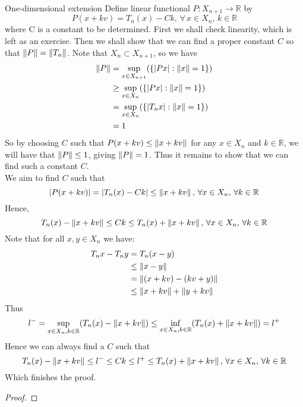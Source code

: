 \documentclass{article}
\begin{document}
\begin{pf}{One-dimensional extension}{}
		Define linear functional $P:X_{n+1}\xrightarrow{}\mathbb{R}$ by
		$$
			P(x+kv)=T_n(x)-Ck,\,\forall\,x\in X_n,\,k\in\mathbb{R}
		$$
		where C is a constant to be determined.
		First we shall check linearity, which is left as an exercise.
		Then we shall show that we can find a proper constant $C$ so that $\left\|{P}\right\|=\left\|{T_n}\right\|$. Note that $X_n\subset X_{n+1}$, so we have
		\begin{equation}
			\begin{split}
				\left\|{P}\right\|&=\sup_{x\in X_{n+1}}(\{|Px|:\left\|{x}\right\|=1\})\\
				&\geq\sup_{x\in X_{n}}(\{|Px|:\left\|{x}\right\|=1\})\\
				&=\sup_{x\in X_{n}}(\{|T_nx|:\left\|{x}\right\|=1\})\\
				&=1
			\end{split}
		\end{equation}
		So by choosing $C$ such that $P(x+kv)\leq \left\|{x+kv}\right\|$ for any $x\in X_n$ and $k\in \mathbb{R}$, we will have that $\left\|{P}\right\|\leq 1$, giving $\left\|{P}\right\|=1$. Thus it remains to show that we can find such a constant $C$.\\
		We aim to find $C$ such that
		$$
			|P(x+kv)|=|T_n(x)-Ck|\leq \left\|{x+kv}\right\|,\,\forall x\in X_n,\,\forall k\in\mathbb{R}
		$$
		Hence,
		$$
			T_n(x)-\left\|{x+kv}\right\|\leq Ck\leq T_n(x)+\left\|{x+kv}\right\|,\,\forall x\in X_n,\,\forall k\in\mathbb{R}
		$$
		Note that for all $x,y\in X_n$ we have:
		\begin{equation}
			\begin{split}
				T_nx-T_ny&=T_n(x-y)\\
				&\leq \left\|{x-y}\right\|\\
				&=\left\|{(x+kv)-(kv+y)}\right\|\\
				&\leq\left\|{x+kv}\right\|+\left\|{y+kv}\right\|
			\end{split}
		\end{equation}
		Thus
		$$
			l^-=\sup_{x\in X_n,k\in\mathbb{R}}(T_n(x)-\left\|{x+kv}\right\|)\leq  \inf_{x\in X_n,k\in\mathbb{R}}(T_n(x)+\left\|{x+kv}\right\|)=l^+
		$$
		Hence we can always find a $C$ such that
		$$
			T_n(x)-\left\|{x+kv}\right\|\leq l^-\leq Ck\leq l^+ \leq T_n(x)+\left\|{x+kv}\right\|,\,\forall x\in X_n,\,\forall k\in\mathbb{R}
		$$
		Which finishes the proof.
	\end{pf}

\begin{remark}

\end{remark}  

\begin{proof}

\end{proof}
\end{document}
